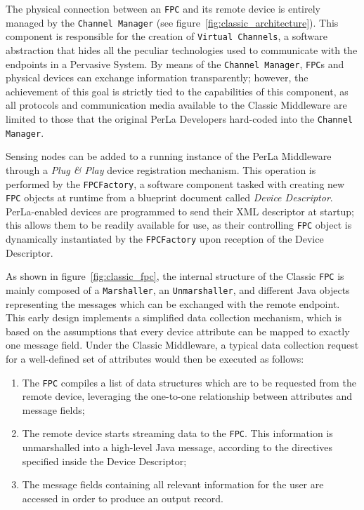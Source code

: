 The physical connection between an \texttt{FPC} and its remote device is
entirely managed by the \texttt{Channel Manager} (see
figure~\ref{fig:classic_architecture}). This component is responsible for the
creation of \texttt{Virtual Channels}, a software abstraction that hides all
the peculiar technologies used to communicate with the endpoints in a Pervasive
System. By means of the \texttt{Channel Manager}, \texttt{FPC}s and physical
devices can exchange information transparently; however, the achievement of
this goal is strictly tied to the capabilities of this component, as all
protocols and communication media available to the Classic Middleware are
limited to those that the original PerLa Developers hard-coded into the
\texttt{Channel Manager}.

Sensing nodes can be added to a running instance of the PerLa Middleware
through a \textit{Plug \& Play} device registration mechanism. This operation
is performed by the \texttt{FPCFactory}, a software component tasked with
creating new \texttt{FPC} objects at runtime from a blueprint document called
\textit{Device Descriptor}. PerLa-enabled devices are programmed to send their
XML descriptor at startup; this allows them to be readily available for use, as
their controlling \texttt{FPC} object is dynamically instantiated by the
\texttt{FPCFactory} upon reception of the Device Descriptor.

As shown in figure~\ref{fig:classic_fpc}, the internal structure of the Classic
\texttt{FPC} is mainly composed of a \texttt{Marshaller}, an
\texttt{Unmarshaller}, and different Java objects representing the messages
which can be exchanged with the remote endpoint. This early design implements a
simplified data collection mechanism, which is based on the assumptions that
every device attribute can be mapped to exactly one message field. Under the
Classic Middleware, a typical data collection request for a well-defined set of
attributes would then be executed as follows:

\begin{enumerate}

    \item The \texttt{FPC} compiles a list of data structures which are to be
        requested from the remote device, leveraging the one-to-one
        relationship between attributes and message fields;

    \item The remote device starts streaming data to the \texttt{FPC}. This
        information is unmarshalled into a high-level Java message, according
        to the directives specified inside the Device Descriptor;

    \item The message fields containing all relevant information for the user
        are accessed in order to produce an output record.

\end{enumerate}

